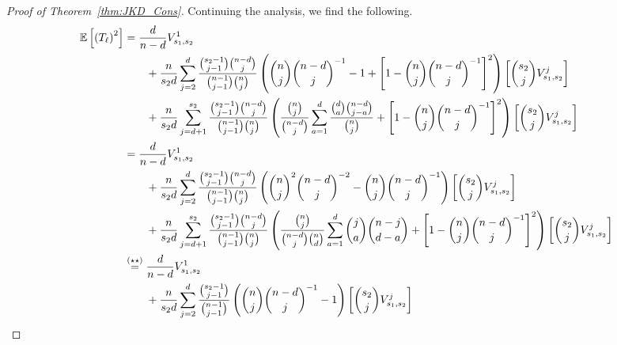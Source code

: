 \begin{proof}[Proof of Theorem~\ref{thm:JKD_Cons}]
	Continuing the analysis, we find the following.
	\begin{equation}
		\begin{aligned}
			\E\left[\left(T_{\ell}\right)^2\right]
			 & = \frac{d}{n - d} V_{s_1, s_2}^{1}                                                                                                                        \\
			 & \quad \quad + \frac{n}{s_2 d}\sum_{j = 2}^{d}\frac{\binom{s_2 - 1}{j - 1}\binom{n - d}{j}}{\binom{n - 1}{j - 1}\binom{n}{j}}
			\left(\binom{n}{j}\binom{n - d}{j}^{-1} - 1
			+ \left[1 - \binom{n}{j}\binom{n-d}{j}^{-1}\right]^{2} \right)\left[\binom{s_2}{j}V_{s_1, s_2}^{j}\right]                                                    \\
			 & \quad \quad + \frac{n}{s_2 d}\sum_{j = d + 1}^{s_2}\frac{\binom{s_2 - 1}{j - 1}\binom{n - d}{j}}{\binom{n - 1}{j - 1}\binom{n}{j}}
			\left(\frac{\binom{n}{j}}{\binom{n - d}{j}}\sum_{a = 1}^{d}\frac{\binom{d}{a}\binom{n - d}{j - a}}{\binom{n}{j}}
			+ \left[1 - \binom{n}{j}\binom{n-d}{j}^{-1}\right]^{2}\right)\left[\binom{s_2}{j}V_{s_1, s_2}^{j}\right]                                                     \\
			 & = \frac{d}{n - d} V_{s_1, s_2}^{1}                                                                                                                        \\
			 & \quad \quad + \frac{n}{s_2 d}\sum_{j = 2}^{d}\frac{\binom{s_2 - 1}{j - 1}\binom{n - d}{j}}{\binom{n - 1}{j - 1}\binom{n}{j}}
			\left(\binom{n}{j}^{2}\binom{n-d}{j}^{-2} - \binom{n}{j}\binom{n-d}{j}^{-1}\right)\left[\binom{s_2}{j}V_{s_1, s_2}^{j}\right]                                \\
			 & \quad \quad + \frac{n}{s_2 d}\sum_{j = d + 1}^{s_2}\frac{\binom{s_2 - 1}{j - 1}\binom{n - d}{j}}{\binom{n - 1}{j - 1}\binom{n}{j}}
			\left(\frac{\binom{n}{j}}{\binom{n - d}{j}\binom{n}{d}}\sum_{a = 1}^{d}\binom{j}{a}\binom{n - j}{d - a}
			+ \left[1 - \binom{n}{j}\binom{n-d}{j}^{-1}\right]^{2}\right)\left[\binom{s_2}{j}V_{s_1, s_2}^{j}\right]                                                     \\
			 & \overset{(\star\star)}{=} \frac{d}{n - d} V_{s_1, s_2}^{1}                                                                                                \\
			 & \quad \quad + \frac{n}{s_2 d}\sum_{j = 2}^{d}\frac{\binom{s_2 - 1}{j - 1}}{\binom{n - 1}{j - 1}}
			\left(\binom{n}{j}\binom{n-d}{j}^{-1} - 1\right)\left[\binom{s_2}{j}V_{s_1, s_2}^{j}\right]                                                                  \\

\end{aligned}
\end{equation}
\end{proof}
